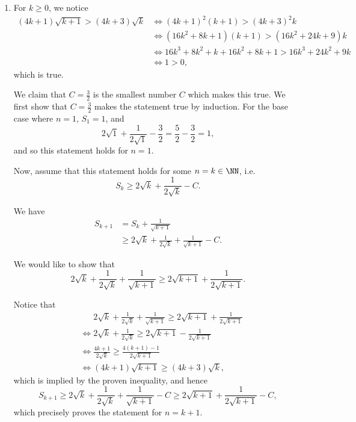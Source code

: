 \begin{enumerate}
    \item For \(k \geq 0\), we notice
          \begin{align*}
              (4k + 1) \sqrt{k + 1} > (4k + 3) \sqrt{k} & \iff (4k + 1)^2 (k + 1) > (4k + 3)^2 k                      \\
                                                        & \iff (16k^2 + 8k + 1) (k + 1) > (16k^2 + 24k + 9) k         \\
                                                        & \iff 16k^3 + 8k^2 + k + 16k^2 + 8k + 1 > 16k^3 + 24k^2 + 9k \\
                                                        & \iff 1 > 0,
          \end{align*}
          which is true.

          We claim that \(C = \frac{3}{2}\) is the smallest number \(C\) which makes this true. We first show that \(C = \frac{3}{2}\) makes the statement true by induction. For the base case where \(n = 1\), \(S_1 = 1\), and
          \[
              2 \sqrt{1} + \frac{1}{2\sqrt{1}} - \frac{3}{2} = \frac{5}{2} - \frac{3}{2} = 1,
          \]
          and so this statement holds for \(n = 1\).

          Now, assume that this statement holds for some \(n = k \in \NN\), i.e.
          \[
              S_k \geq 2\sqrt{k} + \frac{1}{2\sqrt{k}} - C.
          \]

          We have
          \begin{align*}
              S_{k + 1} & = S_k + \frac{1}{\sqrt{k + 1}}                                      \\
                        & \geq 2\sqrt{k} + \frac{1}{2 \sqrt{k}} + \frac{1}{\sqrt{k + 1}} - C.
          \end{align*}

          We would like to show that
          \[
              2\sqrt{k} + \frac{1}{2 \sqrt{k}} + \frac{1}{\sqrt{k + 1}} \geq 2\sqrt{k + 1} + \frac{1}{2\sqrt{k + 1}}.
          \]

          Notice that
          \begin{align*}
               & \phantom{\iff} 2\sqrt{k} + \frac{1}{2 \sqrt{k}} + \frac{1}{\sqrt{k + 1}} \geq 2\sqrt{k + 1} + \frac{1}{2\sqrt{k + 1}} \\
               & \iff 2\sqrt{k} + \frac{1}{2\sqrt{k}} \geq 2\sqrt{k + 1} - \frac{1}{2\sqrt{k + 1}}                                     \\
               & \iff \frac{4k + 1}{2\sqrt{k}} \geq \frac{4(k + 1) - 1}{2\sqrt{k + 1}}                                                 \\
               & \iff (4k + 1) \sqrt{k + 1} \geq (4k + 3) \sqrt{k},
          \end{align*}
          which is implied by the proven inequality, and hence
          \[
              S_{k + 1} \geq 2\sqrt{k} + \frac{1}{2 \sqrt{k}} + \frac{1}{\sqrt{k + 1}} - C \geq 2\sqrt{k + 1} + \frac{1}{2\sqrt{k + 1}} - C,
          \]
          which precisely proves the statement for \(n = k + 1\).


\end{enumerate}
